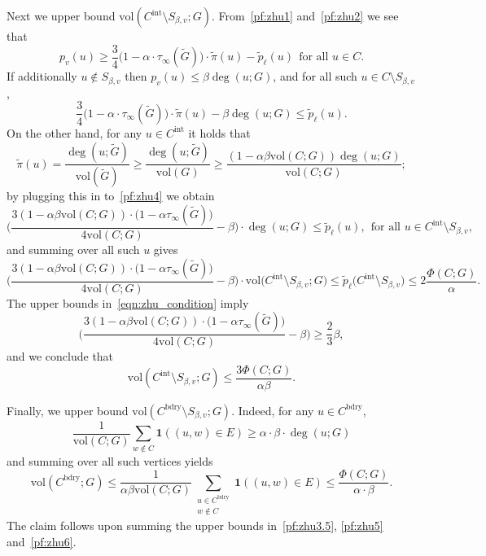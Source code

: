 \documentclass{article}
\newcommand{\vol}{\mathrm{vol}}
\newcommand{\1}{\mathbf{1}}
\newcommand{\wt}[1]{\widetilde{#1}}
\theoremstyle{definition}
\theoremstyle{remark}
\begin{document}
Next we upper bound $\vol(C^{\mathrm{int}} \setminus S_{\beta,v};G)$. From~\eqref{pf:zhu1} and~\eqref{pf:zhu2} we see that 
\begin{equation*}
p_v(u) \geq \frac{3}{4}\bigl(1 - \alpha \cdot \tau_{\infty}(\wt{G})\bigr) \cdot \wt{\pi}(u) - \wt{p}_{\ell}(u)~~\textrm{for all $u \in C$.}
\end{equation*}
If additionally $u \not\in S_{\beta,v}$ then $p_v(u) \leq \beta \deg(u;G)$, and for all such $u \in C \setminus S_{\beta,v}$,
\begin{equation}
\label{pf:zhu4}
\frac{3}{4}\bigl(1 - \alpha \cdot \tau_{\infty}(\wt{G})\bigr) \cdot \wt{\pi}(u) -  \beta\deg(u;G) \leq \wt{p}_{\ell}(u).
\end{equation}
On the other hand, for any $u \in C^{\mathrm{int}}$ it holds that
\begin{equation*}
\wt{\pi}(u) = \frac{\deg(u;\wt{G})}{\vol(\wt{G})} \geq \frac{\deg(u;\wt{G})}{\vol(G)} \geq \frac{(1 - \alpha \beta \vol(C;G))\deg(u;G)}{\vol(C;G)};
\end{equation*}
by plugging this in to~\eqref{pf:zhu4} we obtain
\begin{equation*}
\biggl(\frac{3(1 - \alpha \beta \vol(C;G))\cdot\bigl(1 - \alpha \tau_{\infty}(\wt{G})\bigr)}{4\vol(C;G)} - \beta\biggr) \cdot \deg(u;G) \leq \wt{p}_{\ell}(u),~~\textrm{for all $u \in C^{\mathrm{int}} \setminus S_{\beta,v}$},
\end{equation*}
and summing over all such $u$ gives
\begin{equation*}
\biggl(\frac{3(1 - \alpha \beta \vol(C;G))\cdot\bigl(1 - \alpha \tau_{\infty}(\wt{G})\bigr)}{4\vol(C;G)} - \beta\biggr) \cdot \vol\bigl(C^{\mathrm{int}} \setminus S_{\beta,v}; G\bigr) \leq \wt{p}_{\ell}\bigl(C^{\mathrm{int}} \setminus S_{\beta,v}\bigr) \leq 2\frac{\Phi(C;G)}{\alpha}.
\end{equation*}
The upper bounds in~\eqref{eqn:zhu_condition} imply
\begin{equation*}
\biggl(\frac{3(1 - \alpha \beta \vol(C;G))\cdot\bigl(1 - \alpha \tau_{\infty}(\wt{G})\bigr)}{4\vol(C;G)} - \beta\biggr) \geq \frac{2}{3}\beta,
\end{equation*}
and we conclude that
\begin{equation}
\label{pf:zhu5}
\vol(C^{\mathrm{int}} \setminus S_{\beta,v}; G) \leq \frac{3\Phi(C;G)}{\alpha\beta}.
\end{equation}

Finally, we upper bound $\vol(C^{\mathrm{bdry}} \setminus S_{\beta,v};G)$. Indeed, for any $u \in C^{\mathrm{bdry}}$,
\begin{equation*}
\frac{1}{\vol(C;G)}\sum_{w \not\in C} \1((u,w) \in E) \geq \alpha \cdot \beta \cdot \deg(u;G)
\end{equation*}
and summing over all such vertices yields
\begin{equation}
\label{pf:zhu6}
\vol(C^{\mathrm{bdry}};G) \leq \frac{1}{\alpha \beta \vol(C;G)}\sum_{\substack{u \in C^{\mathrm{bdry}} \\ w \not\in C}} \1((u,w) \in E) \leq \frac{\Phi(C;G)}{\alpha \cdot \beta}.
\end{equation} 
The claim follows upon summing the upper bounds in~\eqref{pf:zhu3.5}, \eqref{pf:zhu5} and~\eqref{pf:zhu6}.
\end{document}
